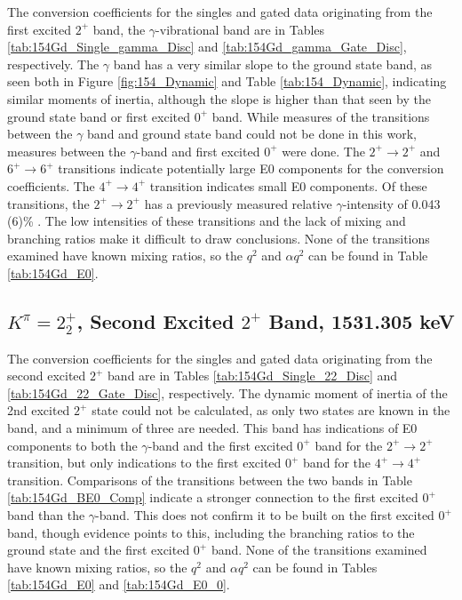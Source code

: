 The conversion coefficients for the singles and gated data originating from the first excited $2^+$ band, the $\gamma$-vibrational band are in Tables \ref{tab:154Gd_Single_gamma_Disc} and \ref{tab:154Gd_gamma_Gate_Disc}, respectively. The $\gamma$ band has a very similar slope to the ground state band, as seen both in Figure \ref{fig:154_Dynamic} and Table \ref{tab:154_Dynamic}, indicating similar moments of inertia, although the slope is higher than that seen by the ground state band or first excited $0^+$ band. While measures of the transitions between the $\gamma$ band and ground state band could not be done in this work, measures between the $\gamma$-band and first excited $0^+$ were done. The $2^+\rightarrow2^+$ and $6^+\rightarrow6^+$ transitions indicate potentially large E0 components for the conversion coefficients. The $4^+\rightarrow4^+$ transition indicates small E0 components. Of these transitions, the $2^+\rightarrow2^+$ has a previously measured relative $\gamma$-intensity of 0.043 (6)\% \citep{reich09:_nds_154}. The low intensities of these transitions and the lack of mixing and branching ratios make it difficult to draw conclusions. None of the transitions examined have known mixing ratios, so the $q^2$ and $\alpha q^2$ can be found in Table \ref{tab:154Gd_E0}.





\subsection{$K^{\pi}=2^+_2$, Second Excited $2^+$ Band, 1531.305 keV}

The conversion coefficients for the singles and gated data originating from the second excited $2^+$ band are in Tables \ref{tab:154Gd_Single_22_Disc} and \ref{tab:154Gd_22_Gate_Disc}, respectively. The dynamic moment of inertia of the 2nd excited $2^+$ state could not be calculated, as only two states are known in the band, and a minimum of three are needed. This band has indications of E0 components to both the $\gamma$-band and the first excited $0^+$ band for the $2^+\rightarrow2^+$ transition, but only indications to the first excited $0^+$ band for the $4^+\rightarrow4^+$ transition. Comparisons of the transitions between the two bands in Table \ref{tab:154Gd_BE0_Comp} indicate a stronger connection to the first excited $0^+$ band than the $\gamma$-band. This does not confirm it to be built on the first excited $0^+$ band, though evidence points to this, including the branching ratios to the ground state and the first excited $0^+$ band.  None of the transitions examined have known mixing ratios, so the $q^2$ and $\alpha q^2$ can be found in Tables \ref{tab:154Gd_E0} and \ref{tab:154Gd_E0_0}.

